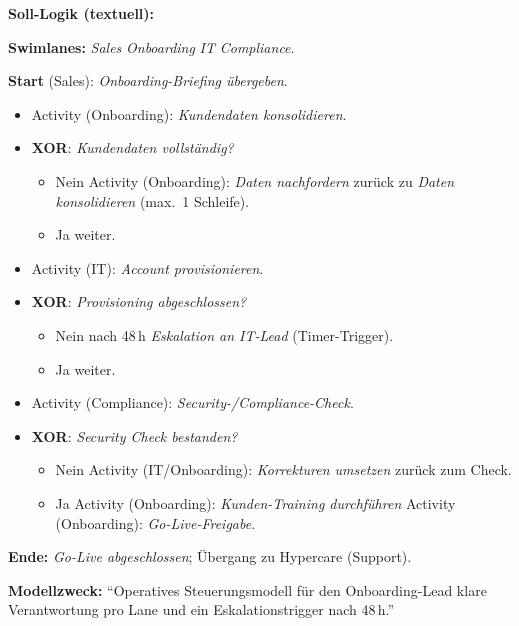 \documentclass[11pt,a4paper,oneside]{article}
\begin{document}
\begin{loesungbox}
\textbf{Soll-Logik (textuell):}

\smallskip
\textbf{Swimlanes:} \emph{Sales} \textperiodcentered{} \emph{Onboarding} \textperiodcentered{} \emph{IT} \textperiodcentered{} \emph{Compliance}.

\smallskip
\textbf{Start} (Sales): \emph{Onboarding-Briefing \"ubergeben}.
\begin{itemize}
  \item Activity (Onboarding): \emph{Kundendaten konsolidieren}.
  \item \textbf{XOR}: \emph{Kundendaten vollst\"andig?}
  \begin{itemize}
    \item Nein \textrightarrow{} Activity (Onboarding): \emph{Daten nachfordern} \textrightarrow{} zur\"uck zu \emph{Daten konsolidieren} (max.\ 1 Schleife).
    \item Ja \textrightarrow{} weiter.
  \end{itemize}
  \item Activity (IT): \emph{Account provisionieren}.
  \item \textbf{XOR}: \emph{Provisioning abgeschlossen?}
  \begin{itemize}
    \item Nein nach 48\,h \textrightarrow{} \emph{Eskalation an IT-Lead} (Timer-Trigger).
    \item Ja \textrightarrow{} weiter.
  \end{itemize}
  \item Activity (Compliance): \emph{Security-/Compliance-Check}.
  \item \textbf{XOR}: \emph{Security Check bestanden?}
  \begin{itemize}
    \item Nein \textrightarrow{} Activity (IT/Onboarding): \emph{Korrekturen umsetzen} \textrightarrow{} zur\"uck zum Check.
    \item Ja \textrightarrow{} Activity (Onboarding): \emph{Kunden-Training durchf\"uhren} \textrightarrow{} Activity (Onboarding): \emph{Go-Live-Freigabe}.
  \end{itemize}
\end{itemize}
\textbf{Ende:} \emph{Go-Live abgeschlossen}; \"Ubergang zu Hypercare (Support).

\smallskip
\textbf{Modellzweck:} ``Operatives Steuerungsmodell f\"ur den Onboarding-Lead \textendash{} klare Verantwortung pro Lane und ein Eskalations\-trigger nach 48\,h.''


\end{loesungbox}
\end{document}
